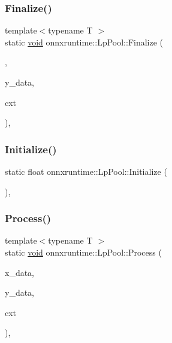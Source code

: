 \subsubsection{\texorpdfstring{Finalize()}{Finalize()}}
{\footnotesize\ttfamily template$<$typename T $>$ \\
static \mbox{\hyperlink{mlasi_8h_a88f941d423cb2a819b70a1358982b1a6}{void}} onnxruntime\+::\+Lp\+Pool\+::\+Finalize (\begin{DoxyParamCaption}\item[{const int64\+\_\+t}]{,  }\item[{T \&}]{y\+\_\+data,  }\item[{const \mbox{\hyperlink{classonnxruntime_1_1PoolProcessContext}{Pool\+Process\+Context}} \&}]{cxt }\end{DoxyParamCaption})\hspace{0.3cm}{\ttfamily [inline]}, {\ttfamily [static]}}

\mbox{\label{classonnxruntime_1_1LpPool_a95e4b48f5d30740b52d62675f4aeaf14}} 
\subsubsection{\texorpdfstring{Initialize()}{Initialize()}}
{\footnotesize\ttfamily static float onnxruntime\+::\+Lp\+Pool\+::\+Initialize (\begin{DoxyParamCaption}{ }\end{DoxyParamCaption})\hspace{0.3cm}{\ttfamily [inline]}, {\ttfamily [static]}}

\mbox{\label{classonnxruntime_1_1LpPool_a4cdfce18edaf2fb76ca549f487878a24}} 
\subsubsection{\texorpdfstring{Process()}{Process()}}
{\footnotesize\ttfamily template$<$typename T $>$ \\
static \mbox{\hyperlink{mlasi_8h_a88f941d423cb2a819b70a1358982b1a6}{void}} onnxruntime\+::\+Lp\+Pool\+::\+Process (\begin{DoxyParamCaption}\item[{const T \&}]{x\+\_\+data,  }\item[{T \&}]{y\+\_\+data,  }\item[{const \mbox{\hyperlink{classonnxruntime_1_1PoolProcessContext}{Pool\+Process\+Context}} \&}]{cxt }\end{DoxyParamCaption})\hspace{0.3cm}{\ttfamily [inline]}, {\ttfamily [static]}}



